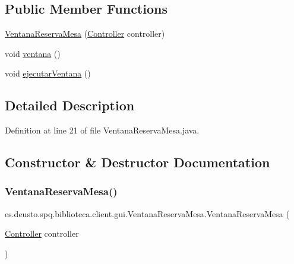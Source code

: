 \subsection*{Public Member Functions}
\begin{DoxyCompactItemize}
\item 
\mbox{\hyperlink{classes_1_1deusto_1_1spq_1_1biblioteca_1_1client_1_1gui_1_1_ventana_reserva_mesa_a07af3780e061e9b4982c0efff9d541a3}{Ventana\+Reserva\+Mesa}} (\mbox{\hyperlink{classes_1_1deusto_1_1spq_1_1biblioteca_1_1controller_1_1_controller}{Controller}} controller)
\item 
void \mbox{\hyperlink{classes_1_1deusto_1_1spq_1_1biblioteca_1_1client_1_1gui_1_1_ventana_reserva_mesa_a4b8df9a84d5e9378de27ca0e1aaaa690}{ventana}} ()
\item 
void \mbox{\hyperlink{classes_1_1deusto_1_1spq_1_1biblioteca_1_1client_1_1gui_1_1_ventana_reserva_mesa_ae2adaaebc76093cbdf64c2f859bc44d8}{ejecutar\+Ventana}} ()
\end{DoxyCompactItemize}


\subsection{Detailed Description}


Definition at line 21 of file Ventana\+Reserva\+Mesa.\+java.



\subsection{Constructor \& Destructor Documentation}
\mbox{\label{classes_1_1deusto_1_1spq_1_1biblioteca_1_1client_1_1gui_1_1_ventana_reserva_mesa_a07af3780e061e9b4982c0efff9d541a3}} 
\subsubsection{\texorpdfstring{Ventana\+Reserva\+Mesa()}{VentanaReservaMesa()}}
{\footnotesize\ttfamily es.\+deusto.\+spq.\+biblioteca.\+client.\+gui.\+Ventana\+Reserva\+Mesa.\+Ventana\+Reserva\+Mesa (\begin{DoxyParamCaption}\item[{\mbox{\hyperlink{classes_1_1deusto_1_1spq_1_1biblioteca_1_1controller_1_1_controller}{Controller}}}]{controller }\end{DoxyParamCaption})}

